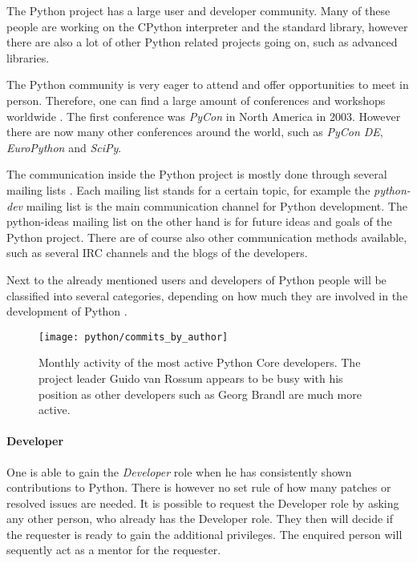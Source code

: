 The Python project has a large user and developer community. Many of these people are
working on the CPython interpreter and the standard library, however there are
also a lot of other Python related projects going on, such as advanced libraries.

The Python community is very eager to attend and offer opportunities to meet in
person. Therefore, one can find a large amount of conferences and workshops
worldwide \cite{PythonConferences}. The first conference was \emph{PyCon} in
North America in 2003. However there are now many other conferences around the
world, such as \emph{PyCon DE}, \emph{EuroPython} and \emph{SciPy}.

The communication inside the Python project is mostly done through several
mailing lists \cite{PythonCommunication}. Each mailing list stands for a
certain topic, for example the \emph{python-dev} mailing list is the main
communication channel for Python development. The python-ideas mailing list on
the other hand is for future ideas and goals of the Python project. There are
of course also other communication methods available, such as several \ac{IRC}
channels and the blogs of the developers.

Next to the already mentioned users and developers of Python people will be
classified into several categories, depending on how much they are involved in
the development of Python \cite{PythonCoreDeveloper}.

\begin{figure}[htbp]
  \centering
  \texttt{[image: python/commits\_by\_author]}
  \caption{Monthly activity of the most active Python Core developers. The
  project leader Guido van Rossum appears to be busy with his position as other
  developers such as Georg Brandl are much more active.}
\end{figure}

\paragraph{Developer}

One is able to gain the \emph{Developer} role when he has consistently shown
contributions to Python. There is however no set rule of how many patches or
resolved issues are needed. It is possible to request the Developer role by
asking any other person, who already has the Developer role. They then will
decide if the requester is ready to gain the additional privileges. The
enquired person will sequently act as a mentor for the requester.

